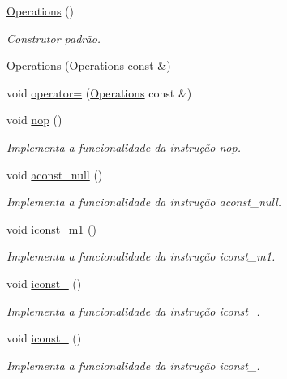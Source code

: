 \begin{DoxyCompactItemize}
\item 
\hyperlink{classOperations_af344ca561c1a08118f686551abb08efb}{Operations} ()
\begin{DoxyCompactList}\small\item\em Construtor padrão. \end{DoxyCompactList}\item 
\hyperlink{classOperations_a83982c91620aa947b25b106d78d51e90}{Operations} (\hyperlink{classOperations}{Operations} const \&)
\item 
void \hyperlink{classOperations_ab6deca5423e5767c3fffef4e5107b627}{operator=} (\hyperlink{classOperations}{Operations} const \&)
\item 
void \hyperlink{classOperations_a3426eecc1b88f11cc8317f99d430a201}{nop} ()
\begin{DoxyCompactList}\small\item\em Implementa a funcionalidade da instrução nop. \end{DoxyCompactList}\item 
void \hyperlink{classOperations_af51ec8a98d9ed3167da0d8ac6279a1cd}{aconst\+\_\+null} ()
\begin{DoxyCompactList}\small\item\em Implementa a funcionalidade da instrução aconst\+\_\+null. \end{DoxyCompactList}\item 
void \hyperlink{classOperations_abb57552d42047d4b685b2d68db6b1fd7}{iconst\+\_\+m1} ()
\begin{DoxyCompactList}\small\item\em Implementa a funcionalidade da instrução iconst\+\_\+m1. \end{DoxyCompactList}\item 
void \hyperlink{classOperations_a89879486791daebe6659b96688465c9d}{iconst\+\_} ()
\begin{DoxyCompactList}\small\item\em Implementa a funcionalidade da instrução iconst\+\_. \end{DoxyCompactList}\item 
void \hyperlink{classOperations_a3933ba76ead633a53683ff8491a313ea}{iconst\+\_} ()
\begin{DoxyCompactList}\small\item\em Implementa a funcionalidade da instrução iconst\+\_. \end{DoxyCompactList}\item 

\end{DoxyCompactItemize}
